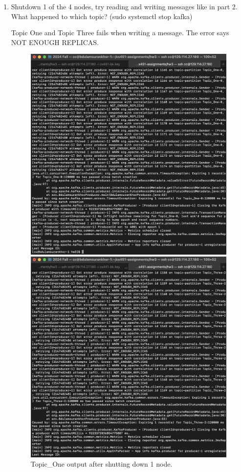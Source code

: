\documentclass{article}
\begin{document}
\begin{enumerate}
  \item Shutdown 1 of the 4 nodes, try reading and writing messages like in part 2. What happened to which topic? (sudo systemctl stop kafka)

  Topic One and Topic Three fails when writing a message. The error says NOT ENOUGH REPLICAS.

  \begin{figure}[H]
    \centering
    \begin{minipage}{0.45\textwidth}
      \centering
      \includegraphics[width=1\textwidth]{image4.png}
      \caption{Topic\_One output after shutting down 1 node.}
    \end{minipage}
    \begin{minipage}{0.45\textwidth}
      \centering
      \includegraphics[width=1\textwidth]{image5.png}

\end{minipage}
\end{figure}
\end{enumerate}
\end{document}
